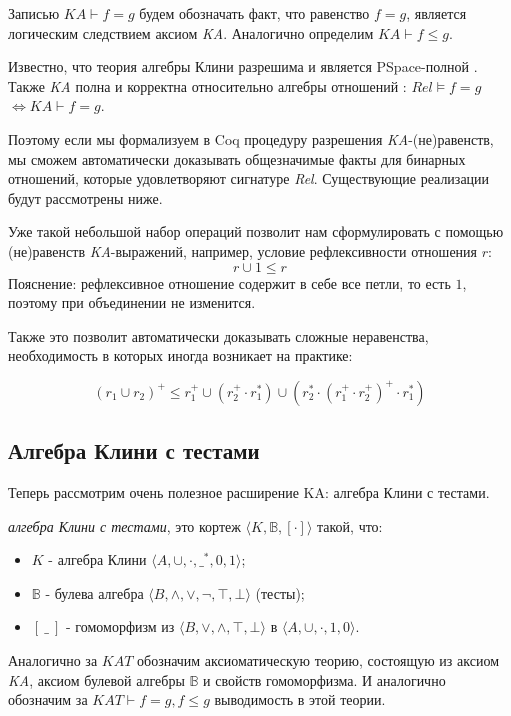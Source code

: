 \documentclass[times
              ,specification
              ,annotation
              ]{itmo-student-thesis}
\begin{document}
      Записью $ \mathit{KA} \vdash f = g $ будем обозначать факт, что равенство $ f = g $, является
      логическим следствием аксиом \textit{KA}.
      Аналогично определим $ \mathit{KA} \vdash f \leq g $.

      Известно, что теория алгебры Клини разрешима и является PSpace-полной \cite{word_problem_pspace}.
      Также \textit{KA} полна и корректна относительно алгебры отношений \cite{AlgebrasOfRelation}: 
      $ \mathit{Rel} \models f = g $ $ \Leftrightarrow \mathit{KA} \vdash f = g$.

      Поэтому если мы формализуем в Coq процедуру разрешения \textit{KA}-(не)равенств, мы сможем
      автоматически доказывать общезначимые факты для бинарных отношений, которые удовлетворяют
      сигнатуре \textit{Rel}.
      Существующие реализации будут рассмотрены ниже.

      Уже такой небольшой набор операций позволит нам сформулировать с помощью (не)равенств
      \textit{KA}-выражений, например, условие рефлексивности отношения $ r $:
      $$ r \cup 1 \leq r $$
      Пояснение: рефлексивное отношение содержит в себе все петли, то есть $ 1 $, поэтому при
      объединении не изменится.

      Также это позволит автоматически доказывать сложные неравенства, необходимость в которых иногда
      возникает на практике:

      $$ (r_1 \cup r_2)^+ \leq r_1^+ \cup (r_2^+ \cdot r_1^*) \cup (r_2^* \cdot (r_1^+ \cdot r_2^+)^+ \cdot r_1^*) $$

    \subsection{Алгебра Клини с тестами}
      Теперь рассмотрим очень полезное расширение KA: алгебра Клини с тестами.

      \textit{алгебра Клини с тестами}, это кортеж $\langle K,\mathbb{B}, [\cdot] \rangle$ такой, что:

      \begin{itemize}
        \item $K$ - алгебра Клини $\langle A, \cup, \cdot, \_^*, 0, 1 \rangle $;
        \item $\mathbb{B}$ - булева алгебра $\langle B, \wedge, \vee, \neg, \top, \bot \rangle $ (тесты);
        \item $[\:\_\:]$ - гомоморфизм из
          $\langle B, \vee, \wedge, \top, \bot \rangle$
        в $\langle A, \cup,  \cdot, 1, 0 \rangle$.
      \end{itemize}
      Аналогично за $ \mathit{KAT} $ обозначим аксиоматическую теорию, состоящую из аксиом \textit{KA},
      аксиом булевой алгебры $ \mathbb{B}$ и свойств гомоморфизма.
      И аналогично обозначим за $ KAT \vdash f = g, f \leq g $ выводимость в этой теории.
\end{document}
